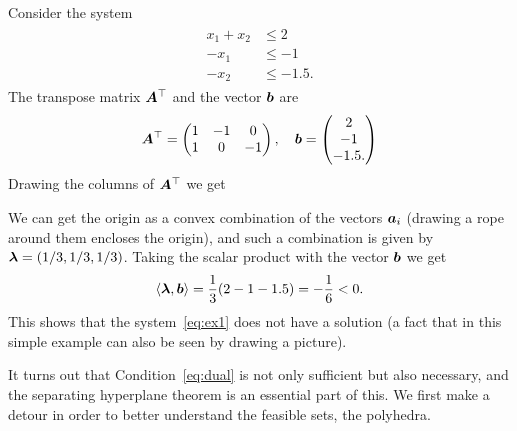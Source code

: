\begin{example}Consider the system
\begin{align}\label{eq:ex1}
\begin{split}
 x_1+x_2 &\leq 2\\
 -x_1 &\leq -1\\
 -x_2 &\leq -1.5.
 \end{split}
\end{align}
The transpose matrix $\bm{A}^{\top}$ and the vector $\bm{b}$ are
\begin{equation*}
 \bm{A}^{\top} = \begin{pmatrix}
                     1 & -1 & 0 \\
                     1 & 0 & -1 
                    \end{pmatrix}, \quad
 \bm{b} = \begin{pmatrix}
            2 \\ -1 \\ -1.5.
           \end{pmatrix}
\end{equation*}
Drawing the columns of $\bm{A}^{\top}$ we get
\begin{figure}[h!]
\centering
{}
\end{figure}
We can get the origin as a convex combination of the vectors $\bm{a}_i$ (drawing a rope around them encloses the origin), and such a combination is given by $\bm{\lambda}=(1/3,1/3,1/3)$. Taking the scalar product with the vector $\bm{b}$ we get
\begin{equation*}
 \langle {\bm{\lambda}}, {\bm{b}} \rangle = \frac{1}{3}(2-1-1.5) = -\frac{1}{6}<0.
\end{equation*}
This shows that the system~\eqref{eq:ex1} does not have a solution (a fact that in this simple example can also be seen by drawing a picture).
\end{example}

It turns out that Condition~\eqref{eq:dual} is not only sufficient but also necessary, and the separating hyperplane theorem is an essential part of this. We first make a detour in order to better understand the feasible sets, the polyhedra.

